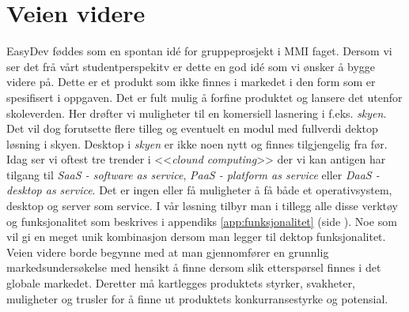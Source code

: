 \section{Veien videre}
EasyDev føddes som en spontan idé for gruppeprosjekt i MMI faget. Dersom vi ser det frå vårt studentperspekitv er dette en god idé som vi ønsker å bygge videre på. Dette er et produkt som ikke finnes i markedet i den form som er spesifisert i oppgaven. Det er fult mulig å forfine produktet og lansere det utenfor skoleverden. 
Her drøfter vi muligheter til en komersiell lasnering i f.eks. \textit{skyen}. Det vil dog forutsette flere tilleg og eventuelt en modul med fullverdi dektop løsning i skyen. Desktop i \textit{skyen} er ikke noen nytt og finnes tilgjengelig fra før. Idag ser vi oftest tre trender i <<\textit{clound computing}>> der vi kan antigen har tilgang til \textit{SaaS - software as service}, \textit{PaaS - platform as service} eller \textit{DaaS - desktop as service}. 
Det er ingen eller få muligheter å få både et operativsystem, desktop og server som service. 
I vår løsning tilbyr man i tillegg alle disse verktøy og funksjonalitet som beskrives i appendiks \ref{app:funksjonalitet} (side \pageref{app:funksjonalitet}). Noe som vil gi en meget unik kombinasjon dersom man legger til dektop funksjonalitet.
Veien videre borde begynne med at man gjennomfører en grunnlig markedsundersøkelse med hensikt å finne dersom slik etterspørsel finnes i det globale markedet. Deretter må kartlegges produktets styrker, svakheter, muligheter og trusler for å finne ut produktets konkurransestyrke og potensial.